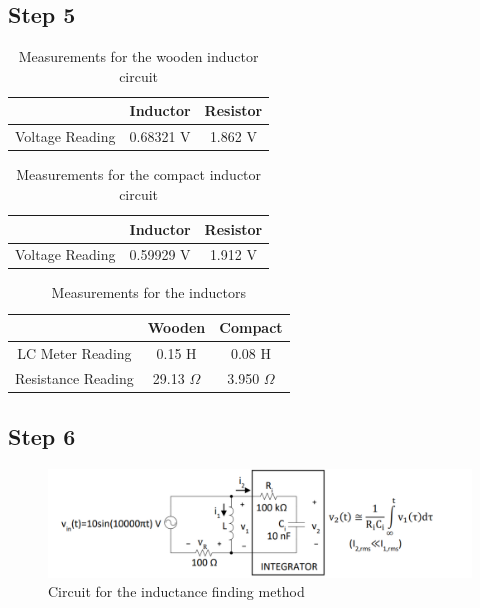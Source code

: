 \documentclass[letterpaper,12pt]{article}
\begin{document}
\subsection{Step 5}

\begin{table}[H]
	\begin{center}
		\caption{Measurements for the wooden inductor circuit}
		\vspace{2mm}
		\begin{tabular}{||c | c | c||} 
		 \hline
		   & Inductor & Resistor \\ [0.5ex] 
		 \hline\hline
		 Voltage Reading & 0.68321 V & 1.862 V \\
		 \hline
		\end{tabular}
\end{center}
\end{table}

\begin{table}[H]
	\begin{center}
		\caption{Measurements for the compact inductor circuit}
		\vspace{2mm}
		\begin{tabular}{||c | c | c||} 
		 \hline
		   & Inductor & Resistor \\ [0.5ex] 
		 \hline\hline
		 Voltage Reading & 0.59929 V & 1.912 V \\
		 \hline

		\end{tabular}
\end{center}
\end{table}


\begin{table}[H]
	\begin{center}
		\caption{Measurements for the inductors}
		\vspace{2mm}
		\begin{tabular}{||c | c | c||} 
		 \hline
		   & Wooden & Compact \\ [0.5ex] 
		 \hline\hline
		LC Meter Reading & 0.15 H & 0.08 H \\
		 \hline
		Resistance Reading & 29.13 \(\Omega\) & 3.950 \(\Omega\) \\
		 \hline
		\end{tabular}
\end{center}
\end{table}

\subsection{Step 6}
\begin{figure}[H]
	\centering
   \includegraphics[width=1\textwidth]{PRE7.png}
   \caption{Circuit for the inductance finding method}
\end{figure}
\end{document}
